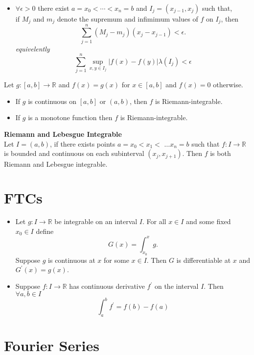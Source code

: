\documentclass[a4paper, 10pt]{article}
\begin{document}
\begin{multicols*}{3}
\begin{itemize}[label=\textbullet, labelsep=0.3em, leftmargin=1em]
\item $\forall\epsilon>0$ there exist $a=x_0<\cdots<x_n=b$ and $I_j = (x_{j-1}, x_j)$ such that, \\
if $M_j$ and $m_j$ denote the supremum and infimimum values of $f$ on $I_j$, then
$$
\sum_{j=1}^n\left(M_j-m_j\right)\left(x_j-x_{j-1}\right)<\epsilon .
$$
\textit{equivelently}
$$
\sum_{j=1}^n \sup _{x, y \in I_j}|f(x)-f(y)| \lambda\left(I_j\right)<\epsilon
$$
\end{itemize}

Let $g:[a, b] \rightarrow \mathbb{R}$ and $f(x)=g(x)$ for $x \in[a, b]$ and $f(x)=0$ otherwise.
\begin{itemize}[label=\textbullet, labelsep=0.3em, leftmargin=1em]
\item If $g$ is continuous on $[a, b]$ or $(a,b)$, then $f$ is Riemann-integrable.
\item If $g$ is a monotone function then $f$ is Riemann-integrable.
\end{itemize}

\textbf{Riemann and Lebesgue Integrable}\\
Let $I=(a, b)$, if there exists points $a=x_0<x_1<$ $\ldots x_n=b$ such that $f: I \rightarrow \mathbb{R}$ is bounded and continuous on each subinterval $\left(x_j, x_{j+1}\right)$. Then $f$ is both Riemann and Lebesgue integrable.

\section*{FTCs}

\begin{itemize}[label=\textbullet, labelsep=0.3em, leftmargin=1em]
\item Let $g: I \rightarrow \mathbb{R}$ be integrable on an interval $I$. For all $x \in I$ and some fixed $x_0 \in I$ define
$$
G(x)=\int_{x_0}^x g .
$$
Suppose $g$ is continuous at $x$ for some $x \in I$. Then $G$ is differentiable at $x$ and $G^{\prime}(x)=g(x)$. 

\item Suppose $f: I \rightarrow \mathbb{R}$ has continuous derivative $f^{\prime}$ on the interval $I$. Then $\forall a, b \in I$
$$
\int_a^b f^{\prime}=f(b)-f(a)
$$
\end{itemize}

\section*{Fourier Series}


\end{multicols*}
\end{document}
